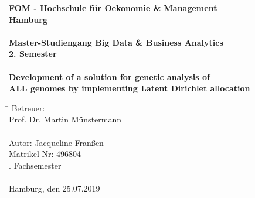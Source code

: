 		\begin{titlepage}
			\begin{center}
					\textbf{\large FOM - Hochschule für Oekonomie \& Management \\
						Hamburg \\
						\ \\
						Master-Studiengang Big Data \& Business Analytics \\
						2. Semester \\
						\ \\
						Development of a solution for genetic analysis of \\
						ALL genomes by implementing Latent Dirichlet allocation\\ 
						}
				
				\begin{tabbing}
					\hspace{2.5cm}\=\kill
					Betreuer: \>  \\
					\> Prof. Dr. Martin Münstermann \glqq \grqq \\
					\ \\
					Autor: \> Jacqueline Franßen \\
					\> Matrikel-Nr: 496804 \\
					. Fachsemester \\
					\ \\
					Hamburg, den 25.07.2019
				\end{tabbing}
			\end{center}
		\end{titlepage}

%

			\setcounter{tocdepth}{3}
			\setcounter{secnumdepth}{3}		
			\thispagestyle{empty}
			\tableofcontents
			\newpage
			\listoffigures
			\listoftables
			\printglossary[type=acronym,style=listdotted,title=Abkürzungsverzeichnis,toctitle=Abkürzungsverzeichnis] 
			\newpage
			\thispagestyle{empty}